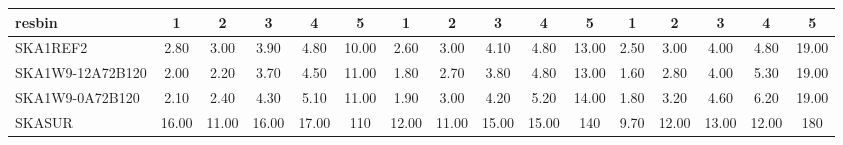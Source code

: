\begin{table}[!htp]
{{\begin{tabular}{|lccccc||ccccc||ccccc|}
 resbin  &1 & 2 & 3 & 4 & 5 & 1 & 2 & 3 & 4 & 5 & 1 & 2 & 3 & 4 & 5 \tabularnewline \hline
SKA1REF2 & 2.80 \cellcolor{blue!20.40} & 3.00 \cellcolor{red!21.82} & 3.90 \cellcolor{green!18.68} & 4.80 \cellcolor{orange!19.01} & 10.00 \cellcolor{purple!18.00} & 2.60 \cellcolor{blue!21.29} & 3.00 \cellcolor{red!19.52} & 4.10 \cellcolor{green!19.12} & 4.80 \cellcolor{orange!18.00} & 13.00 \cellcolor{purple!18.00} & 2.50 \cellcolor{blue!22.67} & 3.00 \cellcolor{red!18.91} & 4.00 \cellcolor{green!18.00} & 4.80 \cellcolor{orange!18.00} & 19.00 \cellcolor{purple!18.00}\\ \hline 
SKA1W9-12A72B120 & 2.00 \cellcolor{blue!18.00} & 2.20 \cellcolor{red!18.00} & 3.70 \cellcolor{green!18.00} & 4.50 \cellcolor{orange!18.00} & 11.00 \cellcolor{purple!18.42} & 1.80 \cellcolor{blue!18.00} & 2.70 \cellcolor{red!18.00} & 3.80 \cellcolor{green!18.00} & 4.80 \cellcolor{orange!18.00} & 13.00 \cellcolor{purple!18.00} & 1.60 \cellcolor{blue!18.00} & 2.80 \cellcolor{red!18.00} & 4.00 \cellcolor{green!18.00} & 5.30 \cellcolor{orange!20.92} & 19.00 \cellcolor{purple!18.00}\\ \hline 
SKA1W9-0A72B120 & 2.10 \cellcolor{blue!18.30} & 2.40 \cellcolor{red!18.95} & 4.30 \cellcolor{green!20.05} & 5.10 \cellcolor{orange!20.02} & 11.00 \cellcolor{purple!18.42} & 1.90 \cellcolor{blue!18.41} & 3.00 \cellcolor{red!19.52} & 4.20 \cellcolor{green!19.50} & 5.20 \cellcolor{orange!19.65} & 14.00 \cellcolor{purple!18.33} & 1.80 \cellcolor{blue!19.04} & 3.20 \cellcolor{red!19.83} & 4.60 \cellcolor{green!20.80} & 6.20 \cellcolor{orange!26.17} & 19.00 \cellcolor{purple!18.00}\\ \hline 
SKASUR & 16.00 \cellcolor{blue!60.00} & 11.00 \cellcolor{red!60.00} & 16.00 \cellcolor{green!60.00} & 17.00 \cellcolor{orange!60.00} & 110 \cellcolor{purple!60.00} & 12.00 \cellcolor{blue!60.00} & 11.00 \cellcolor{red!60.00} & 15.00 \cellcolor{green!60.00} & 15.00 \cellcolor{orange!60.00} & 140 \cellcolor{purple!60.00} & 9.70 \cellcolor{blue!60.00} & 12.00 \cellcolor{red!60.00} & 13.00 \cellcolor{green!60.00} & 12.00 \cellcolor{orange!60.00} & 180 \cellcolor{purple!60.00}\tabularnewline \hline 
\end{tabular}}\hfil 
{}}
\end{table}
